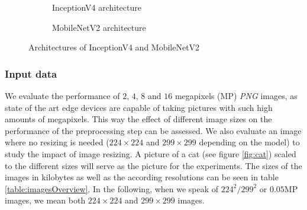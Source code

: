 \begin{figure}[!htb]
\centering
\begin{subfigure}[t]{0.47\textwidth}
   \resizebox{.99\linewidth}{!}{}
   \caption{InceptionV4 architecture \cite{InceptionV4}}
   \label{fig:inceptionv4Archi} 
\end{subfigure}%
\begin{subfigure}[t]{0.47\textwidth}
   \resizebox{.99\linewidth}{!}{}
   \caption{MobileNetV2 architecture \cite{DBLP:journals/corr/abs-1801-04381}}
   \label{fig:MobileNetArchi}
\end{subfigure}

\caption{Architectures of InceptionV4 and MobileNetV2}
\end{figure}

\subsubsection{Input data}
We evaluate the performance of $2$, $4$, $8$ and $16$  megapixels (MP) \emph{PNG} images, as state of the art edge devices are capable of taking pictures with such high amounts of megapixels. This way the effect of different image sizes on the performance of the preprocessing step can be assessed. We also evaluate an image where no resizing is needed ($224\times224$ and $299\times299$ depending on the model) to study the impact of image resizing. A picture of a cat (see figure \ref{fig:cat}) scaled to the different sizes will serve as the picture for the experiments.
The sizes of the images in kilobytes as well as the according resolutions can be seen in table \ref{table:imagesOverview}. In the following, when we speak of $224^2/299^2$ or $0.05$MP images, we mean both $224\times224$ and $299\times299$ images.

